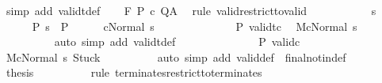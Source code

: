 \begin{isabellebody}
\ {\isacharparenleft}simp\ add{\isacharcolon}\ validt{\isacharunderscore}def{\isacharparenright}\isanewline
\ \ \isamarkupfalse%
\ {\isachardoublequoteopen}{\isasymGamma}{\isasymTurnstile}\isactrlbsub {\isacharslash}F\isactrlesub \ P\ c\ Q{\isacharcomma}A{\isachardoublequoteclose}\ \isamarkupfalse%
\ {\isacharparenleft}rule\ valid{\isacharunderscore}restrict{\isacharunderscore}to{\isacharunderscore}valid{\isacharparenright}\isanewline
\ \ \isamarkupfalse%
\isanewline
\ \ \isacommand{{\isacharbraceleft}}\isamarkupfalse%
\isanewline
\ \ \ \ \isamarkupfalse%
\ s\isanewline
\ \ \ \ \isamarkupfalse%
\ P{\isacharcolon}\ {\isachardoublequoteopen}s\ {\isasymin}\ P{\isachardoublequoteclose}\isanewline
\ \ \ \ \isamarkupfalse%
\ {\isachardoublequoteopen}{\isasymGamma}{\isasymturnstile}c{\isasymdown}Normal\ s{\isachardoublequoteclose}\isanewline
\ \ \ \ \isamarkupfalse%
\ {\isacharminus}\isanewline
\ \ \ \ \ \ \isamarkupfalse%
\ P\ validt{\isacharunderscore}c\ \isamarkupfalse%
\ {\isachardoublequoteopen}{\isasymGamma}{\isacharbar}\isactrlbsub M\isactrlesub {\isasymturnstile}c{\isasymdown}Normal\ s{\isachardoublequoteclose}\isanewline
\ \ \ \ \ \ \ \ \isamarkupfalse%
\ {\isacharparenleft}auto\ simp\ add{\isacharcolon}\ validt{\isacharunderscore}def{\isacharparenright}\isanewline
\ \ \ \ \ \ \isamarkupfalse%
\isanewline
\ \ \ \ \ \ \isamarkupfalse%
\ P\ valid{\isacharunderscore}c\isanewline
\ \ \ \ \ \ \isamarkupfalse%
\ {\isachardoublequoteopen}{\isasymGamma}{\isacharbar}\isactrlbsub M\isactrlesub {\isasymturnstile}{\isasymlangle}c{\isacharcomma}Normal\ s{\isasymrangle}\ {\isasymRightarrow}{\isasymnotin}{\isacharbraceleft}Stuck{\isacharbraceright}{\isachardoublequoteclose}\isanewline
\ \ \ \ \ \ \ \ \isamarkupfalse%
\ {\isacharparenleft}auto\ simp\ add{\isacharcolon}\ valid{\isacharunderscore}def\ \ final{\isacharunderscore}notin{\isacharunderscore}def{\isacharparenright}\isanewline
\ \ \ \ \ \ \isamarkupfalse%
\ \isamarkupfalse%
\ {\isacharquery}thesis\isanewline
\ \ \ \ \ \ \ \ \isamarkupfalse%
\ {\isacharparenleft}rule\ terminates{\isacharunderscore}restrict{\isacharunderscore}to{\isacharunderscore}terminates{\isacharparenright}\isanewline
\ \ \ \ \isamarkupfalse%
\isanewline
\ \ \ \isacommand{{\isacharbraceright}}\isamarkupfalse%
\isanewline
\ \ \ \isamarkupfalse%

\end{isabellebody}
